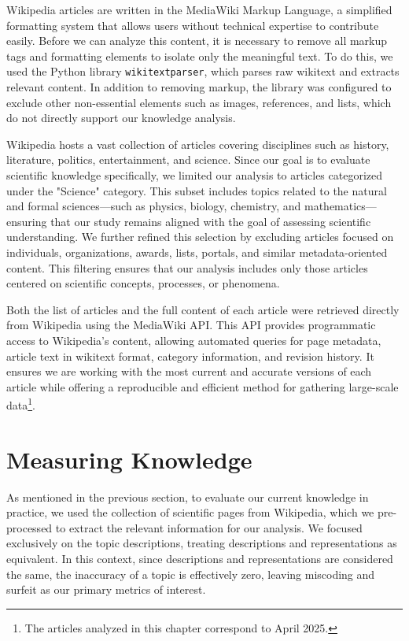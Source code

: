 Wikipedia articles are written in the MediaWiki Markup Language, a simplified formatting system that allows users without technical expertise to contribute easily. Before we can analyze this content, it is necessary to remove all markup tags and formatting elements to isolate only the meaningful text. To do this, we used the Python library \texttt{wikitextparser}, which parses raw wikitext and extracts relevant content. In addition to removing markup, the library was configured to exclude other non-essential elements such as images, references, and lists, which do not directly support our knowledge analysis.

Wikipedia hosts a vast collection of articles covering disciplines such as history, literature, politics, entertainment, and science. Since our goal is to evaluate scientific knowledge specifically, we limited our analysis to articles categorized under the "Science" category. This subset includes topics related to the natural and formal sciences—such as physics, biology, chemistry, and mathematics—ensuring that our study remains aligned with the goal of assessing scientific understanding. We further refined this selection by excluding articles focused on individuals, organizations, awards, lists, portals, and similar metadata-oriented content. This filtering ensures that our analysis includes only those articles centered on scientific concepts, processes, or phenomena.

Both the list of articles and the full content of each article were retrieved directly from Wikipedia using the MediaWiki API. This API provides programmatic access to Wikipedia's content, allowing automated queries for page metadata, article text in wikitext format, category information, and revision history. It ensures we are working with the most current and accurate versions of each article while offering a reproducible and efficient method for gathering large-scale data\footnote{The articles analyzed in this chapter correspond to April 2025.}.

%
%
\section{Measuring Knowledge}

As mentioned in the previous section, to evaluate our current knowledge in practice, we used the collection of scientific pages from Wikipedia, which we pre-processed to extract the relevant information for our analysis. We focused exclusively on the topic descriptions, treating descriptions and representations as equivalent. In this context, since descriptions and representations are considered the same, the inaccuracy of a topic is effectively zero, leaving miscoding and surfeit as our primary metrics of interest.

